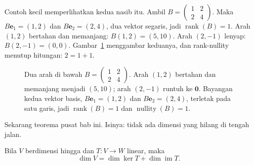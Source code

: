 Contoh kecil memperlihatkan kedua nasib itu. Ambil
$B=\begin{pmatrix}1&2\\2&4\end{pmatrix}$. Maka $B\mathbf{e}_{1}=(1,2)$ dan
$B\mathbf{e}_{2}=(2,4)$, dua vektor segaris, jadi $\operatorname{rank}(B)=1$. Arah $(1,2)$
bertahan dan memanjang: $B(1,2)=(5,10)$. Arah $(2,-1)$ lenyap: $B(2,-1)=(0,0)$.
Gambar~\ref{fig:arah} menggambar keduanya, dan rank-nullity menutup hitungan: $2=1+1$.

\begin{figure}[htbp]
\centering
{}
\caption{Dua arah di bawah $B=\begin{pmatrix}1&2\\2&4\end{pmatrix}$. Arah $(1,2)$ bertahan dan
memanjang menjadi $(5,10)$; arah $(2,-1)$ runtuh ke $\mathbf{0}$. Bayangan kedua vektor basis,
$B\mathbf{e}_{1}=(1,2)$ dan $B\mathbf{e}_{2}=(2,4)$, terletak pada satu garis, jadi
$\operatorname{rank}(B)=1$ dan $\operatorname{nullity}(B)=1$.}
\label{fig:arah}
\end{figure}

Sekarang teorema pusat bab ini. Isinya: tidak ada dimensi yang hilang di tengah jalan.

\begin{teorema}
Bila $V$ berdimensi hingga dan $T\colon V\to W$ linear, maka
\[
  \dim V=\dim\ker T+\dim\operatorname{im}T .
\]
\end{teorema}

